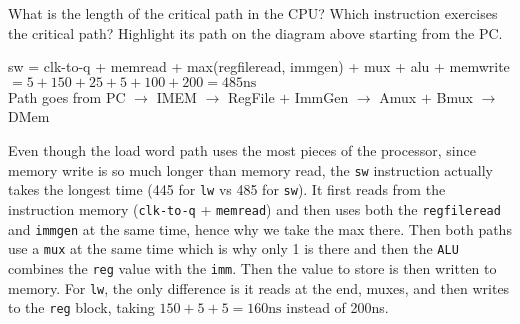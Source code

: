 \begin{blocksection}
\question
What is the length of the critical path in the CPU? Which instruction exercises the critical path?  Highlight its path on the diagram above starting from the PC.




\begin{solution}[0.5in]
sw = clk-to-q + memread + max(regfileread, immgen) + mux + alu + memwrite \\
$= 5+150+25+5+100+200 = 485\text{ns}$\\

Path goes from PC $\rightarrow$ IMEM $\rightarrow$ RegFile $+$ ImmGen $\rightarrow$ Amux $+$ Bmux $\rightarrow$ DMem

Even though the load word path uses the most pieces of the processor, since memory write is so much longer than memory read, the \texttt{sw} instruction actually takes the longest time (445 for \texttt{lw} vs 485 for \texttt{sw}).  It first reads from the instruction memory (\texttt{clk-to-q} + \texttt{memread}) and then uses both the \texttt{regfileread} and \texttt{immgen} at the same time, hence why we take the max there.  Then both paths use a \texttt{mux} at the same time which is why only 1 is there and then the \texttt{ALU} combines the \texttt{reg} value with the \texttt{imm}.  Then the value to store is then written to memory.  For \texttt{lw}, the only difference is it reads at the end, muxes, and then writes to the \texttt{reg} block, taking $150+5+5=160\text{ns}$ instead of 200ns.

\end{solution}

\end{blocksection}

